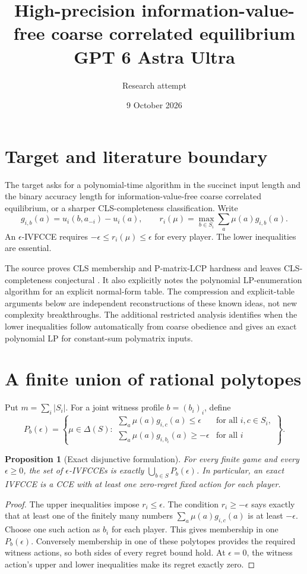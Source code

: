 \documentclass[11pt]{article}
\title{High-precision information-value-free coarse correlated equilibrium\\ GPT 6 Astra Ultra}
\author{Research attempt}
\date{9 October 2026}
\newtheorem{proposition}[theorem]{Proposition}
\theoremstyle{definition}
\begin{document}
\maketitle

\section*{Target and literature boundary}
The target asks for a polynomial-time algorithm in the succinct input length and the binary accuracy length for information-value-free coarse correlated equilibrium, or a sharper CLS-completeness classification. Write
\[
 g_{i,b}(a)=u_i(b,a_{-i})-u_i(a),\qquad
 r_i(\mu)=\max_{b\in S_i}\sum_a\mu(a)g_{i,b}(a).
\]
An $\epsilon$-IVFCCE requires $-\epsilon\le r_i(\mu)\le\epsilon$ for every player. The lower inequalities are essential.

The source proves CLS membership and P-matrix-LCP hardness and leaves CLS-completeness conjectural \cite{az}. It also explicitly notes the polynomial LP-enumeration algorithm for an explicit normal-form table. The compression and explicit-table arguments below are independent reconstructions of these known ideas, not new complexity breakthroughs. The additional restricted analysis identifies when the lower inequalities follow automatically from coarse obedience and gives an exact polynomial LP for constant-sum polymatrix inputs.

\section*{A finite union of rational polytopes}
Put $m=\sum_i|S_i|$. For a joint witness profile $b=(b_i)_i$, define
\[
 P_b(\epsilon)=\left\{\mu\in\Delta(S):
 \begin{array}{ll}
 \sum_a\mu(a)g_{i,c}(a)\le\epsilon&\text{for all }i,c\in S_i,\\
 \sum_a\mu(a)g_{i,b_i}(a)\ge-\epsilon&\text{for all }i
 \end{array}\right\}.
\]
\begin{proposition}[Exact disjunctive formulation]
For every finite game and every $\epsilon\ge0$, the set of $\epsilon$-IVFCCEs is exactly $\bigcup_{b\in S}P_b(\epsilon)$. In particular, an exact IVFCCE is a CCE with at least one zero-regret fixed action for each player.
\end{proposition}
\begin{proof}
The upper inequalities impose $r_i\le\epsilon$. The condition $r_i\ge-\epsilon$ says exactly that at least one of the finitely many numbers $\sum_a\mu(a)g_{i,c}(a)$ is at least $-\epsilon$. Choose one such action as $b_i$ for each player. This gives membership in one $P_b(\epsilon)$. Conversely membership in one of these polytopes provides the required witness actions, so both sides of every regret bound hold. At $\epsilon=0$, the witness action's upper and lower inequalities make its regret exactly zero.
\end{proof}
\end{document}
